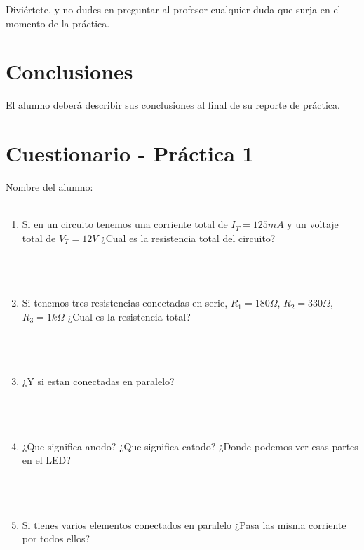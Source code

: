     Diviértete, y no dudes en preguntar al profesor cualquier duda que surja en el momento de la práctica. \\


\section{Conclusiones}
	El alumno deberá describir sus conclusiones al final de su reporte de práctica.

\begin{center}
	\huge \textthing
\end{center}


\clearpage
\section{Cuestionario - Práctica 1}
	Nombre del alumno: \\[0.2cm]
	\horrule{0.5pt} \\[0.2cm] %

	\begin{enumerate}
		\item Si en un circuito tenemos una corriente total de $I_T = 125 mA$ y un voltaje total de $V_T = 12 V$ ¿Cual es la resistencia total del circuito? \\ \\ \\ \\
		\item Si tenemos tres resistencias conectadas en serie, $R_1 = 180 \Omega$, $R_2 = 330 \Omega$, $R_3 = 1 k \Omega$ ¿Cual es la resistencia total? \\ \\ \\ \\
		\item ¿Y si estan conectadas en paralelo? \\ \\ \\ \\
		\item ¿Que significa anodo? ¿Que significa catodo? ¿Donde podemos ver esas partes en el LED? \\ \\ \\ \\
		\item Si tienes varios elementos conectados en paralelo ¿Pasa las misma corriente por todos ellos? \\
	\end{enumerate}
    
